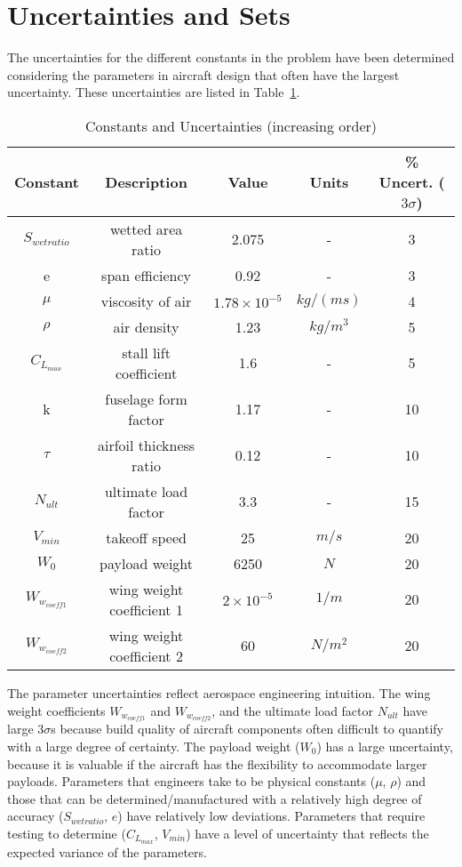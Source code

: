 \section{Uncertainties and Sets}

The uncertainties for the different constants in the problem have been determined
considering the parameters in aircraft design that often have the largest uncertainty.
These uncertainties are listed in Table~\ref{tab:uncertainties}.

\begin{table}
\begin{center}
\caption{\label{tab:uncertainties} Constants and Uncertainties (increasing order)}
\begin{tabular}{c c c c c}
\hline
Constant & Description & Value & Units &\% Uncert. ($3\sigma$) \\
\hline
$S_{wetratio}$ & wetted area ratio & 2.075 & - & 3\\
e & span efficiency & 0.92 & - & 3\\
$\mu$ & viscosity of air & $1.78 \times 10^{-5}$ & $kg/(ms)$ & 4 \\
$\rho$ & air density & 1.23 & $kg/m^3$ & 5 \\
$C_{L_{max}}$ & stall lift coefficient & 1.6 & - & 5\\
k & fuselage form factor & 1.17 & - & 10\\
$\tau$ & airfoil thickness ratio & 0.12 & - & 10\\
$N_{ult}$ & ultimate load factor & 3.3 & - & 15\\
$V_{min}$ & takeoff speed & 25 & $m/s$ & 20\\
$W_0$ & payload weight & 6250 & $N$ & 20\\
$W_{w_{coeff1}}$ & wing weight coefficient 1 & $2 \times 10^{-5}$ & $1/m$ & 20\\
$W_{w_{coeff2}}$ & wing weight coefficient 2 & 60 & $N/m^2$ & 20\\
\hline
\end{tabular}
\end{center}
\end{table}

The parameter uncertainties reflect aerospace engineering intuition.
The wing weight coefficients $W_{w_{coeff1}}$ and $W_{w_{coeff2}}$, and the ultimate load factor $N_{ult}$ have
large $3\sigma$s because build quality of aircraft components often difficult to quantify with a large degree of certainty.
The payload weight ($W_0$) has a large uncertainty, because it is valuable if the aircraft
has the flexibility to accommodate larger payloads. Parameters that engineers take to be
physical constants ($\mu$, $\rho$) and those that can be determined/manufactured with a relatively
high degree of accuracy ($S_{wetratio}$, $e$) have relatively low deviations.
Parameters that require testing to determine ($C_{L_{max}}$, $V_{min}$) have a level of uncertainty
that reflects the expected variance of the parameters.
